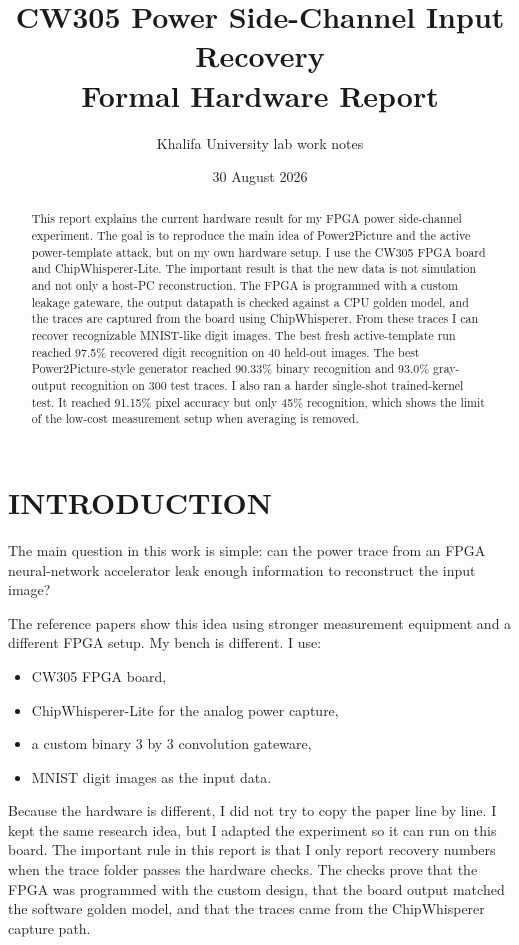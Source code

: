 \documentclass[11pt]{article}
\title{CW305 Power Side-Channel Input Recovery\\Formal Hardware Report}
\author{Khalifa University lab work notes}
\date{30 August 2026}
\begin{document}
\maketitle

\begin{abstract}
This report explains the current hardware result for my FPGA power
side-channel experiment. The goal is to reproduce the main idea of
Power2Picture and the active power-template attack, but on my own hardware
setup. I use the CW305 FPGA board and ChipWhisperer-Lite. The important result
is that the new data is not simulation and not only a host-PC reconstruction.
The FPGA is programmed with a custom leakage gateware, the output datapath is
checked against a CPU golden model, and the traces are captured from the board
using ChipWhisperer. From these traces I can recover recognizable MNIST-like
digit images. The best fresh active-template run reached 97.5\% recovered digit
recognition on 40 held-out images. The best Power2Picture-style generator
reached 90.33\% binary recognition and 93.0\% gray-output recognition on 300
test traces. I also ran a harder single-shot trained-kernel test. It reached
91.15\% pixel accuracy but only 45\% recognition, which shows the limit of the
low-cost measurement setup when averaging is removed.
\end{abstract}

\tableofcontents
\newpage

\section{INTRODUCTION}

The main question in this work is simple: can the power trace from an FPGA
neural-network accelerator leak enough information to reconstruct the input
image?

The reference papers show this idea using stronger measurement equipment and a
different FPGA setup. My bench is different. I use:

\begin{itemize}
  \item CW305 FPGA board,
  \item ChipWhisperer-Lite for the analog power capture,
  \item a custom binary 3 by 3 convolution gateware,
  \item MNIST digit images as the input data.
\end{itemize}

Because the hardware is different, I did not try to copy the paper line by
line. I kept the same research idea, but I adapted the experiment so it can run
on this board. The important rule in this report is that I only report recovery
numbers when the trace folder passes the hardware checks. The checks prove that
the FPGA was programmed with the custom design, that the board output matched
the software golden model, and that the traces came from the ChipWhisperer
capture path.
\end{document}
